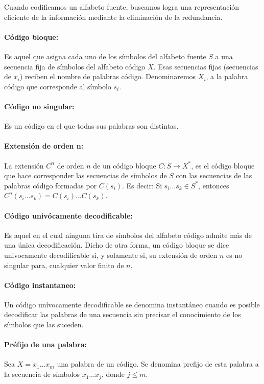 Cuando codificamos un alfabeto fuente, buscamos logra una representación eficiente de la información mediante la eliminación de la redundancia.

\paragraph{Código bloque:} Es aquel que asigna cada uno de los símbolos del alfabeto fuente \(S\) a una secuencia fija de símbolos del alfabeto código \(X\). Esas secuencias fijas (secuencias de \(x_i\)) reciben el nombre de palabras
código. Denominaremos \(X_i\), a la palabra código que corresponde al símbolo \(s_i\).

\paragraph{Código no singular:} Es un código en el que todas sus palabras son distintas.

\paragraph{Extensión de orden n:} La extensión \(C^n\) de orden \(n\) de un código bloque \(C:S\to X^*\), es el código bloque que hace corresponder las secuencias de símbolos de \(S\) con las secuencias de las palabras código formadas por \(C(s_i)\). Es decir: Si \(s_i\dots s_k\in S^*\), entonces \(C^n(s_i\dots s_k) = C(s_i)\dots C(s_k)\).

\paragraph{Código univócamente decodificable:} Es aquel en el cual ninguna tira de símbolos del alfabeto código admite más de una única decodificación. Dicho de otra forma, un código bloque se dice univocamente decodificable si, y solamente si, su extensión de orden \(n\) es no singular para, cualquier valor finito de \(n\).

\paragraph{Código instantaneo:} Un código unívocamente decodificable se denomina instantáneo cuando es posible decodificar las palabras de una secuencia sin precisar el conocimiento de los símbolos que las suceden.

\paragraph{Préfijo de una palabra:} Sea \(X=x_1\dots x_m\) una palabra de un código. Se denomina prefijo de esta palabra a la secuencia de símbolos \(x_1\dots x_j\), donde \(j \leq m\).

